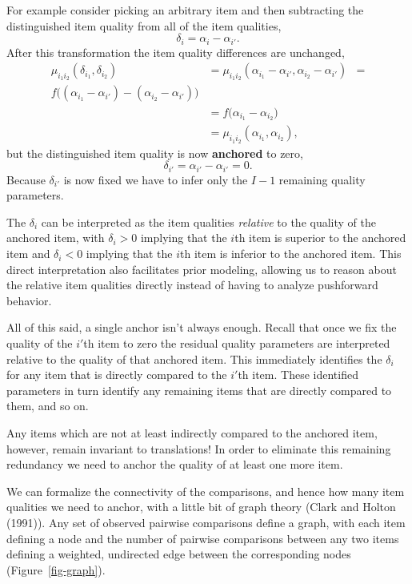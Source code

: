 \documentclass[
  letterpaper,
  DIV=11,
  numbers=noendperiod]{scrartcl}
\begin{document}
For example consider picking an arbitrary item and then subtracting the
distinguished item quality from all of the item qualities, \[
\delta_{i} = \alpha_{i} - \alpha_{i'}.
\] After this transformation the item quality differences are unchanged,
\begin{align*}
\mu_{i_{1} i_{2}}( \delta_{i_{1}}, \delta_{i_{2}} )
&=
\mu_{i_{1} i_{2}}( \alpha_{i_{1}} - \alpha_{i'},
                   \alpha_{i_{2}} - \alpha_{i'} )
&=
\\
f \big(  (\alpha_{i_{1}} - \alpha_{i'})
       - (\alpha_{i_{2}} - \alpha_{i'}) \big)
\\
&=
f \big( \alpha_{i_{1}} - \alpha_{i_{2}} \big)
\\
&=
\mu_{i_{1} i_{2}}( \alpha_{i_{1}}, \alpha_{i_{2}} ),
\end{align*} but the distinguished item quality is now \textbf{anchored}
to zero, \[
\delta_{i'} = \alpha_{i'} - \alpha_{i'} = 0.
\] Because \(\delta_{i'}\) is now fixed we have to infer only the
\(I - 1\) remaining quality parameters.

The \(\delta_{i}\) can be interpreted as the item qualities
\emph{relative} to the quality of the anchored item, with
\(\delta_{i} > 0\) implying that the \(i\)th item is superior to the
anchored item and \(\delta_{i} < 0\) implying that the \(i\)th item is
inferior to the anchored item. This direct interpretation also
facilitates prior modeling, allowing us to reason about the relative
item qualities directly instead of having to analyze pushforward
behavior.

All of this said, a single anchor isn't always enough. Recall that once
we fix the quality of the \(i'\)th item to zero the residual quality
parameters are interpreted relative to the quality of that anchored
item. This immediately identifies the \(\delta_{i}\) for any item that
is directly compared to the \(i'\)th item. These identified parameters
in turn identify any remaining items that are directly compared to them,
and so on.

Any items which are not at least indirectly compared to the anchored
item, however, remain invariant to translations! In order to eliminate
this remaining redundancy we need to anchor the quality of at least one
more item.

We can formalize the connectivity of the comparisons, and hence how many
item qualities we need to anchor, with a little bit of graph theory
(Clark and Holton (1991)). Any set of observed pairwise comparisons
define a graph, with each item defining a node and the number of
pairwise comparisons between any two items defining a weighted,
undirected edge between the corresponding nodes
(Figure~\ref{fig-graph}).
\end{document}
